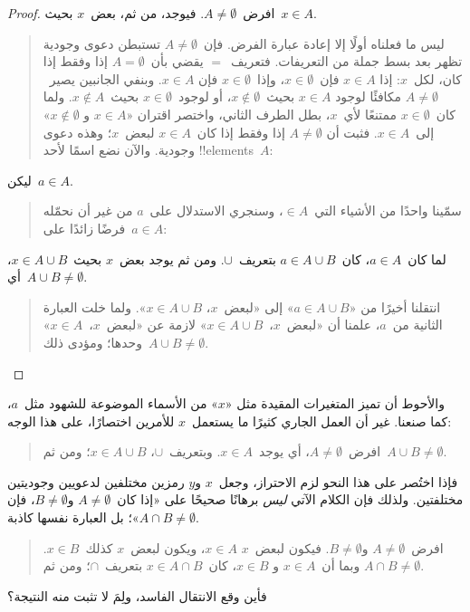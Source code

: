 \documentclass[../../../include/open-logic-section]{subfiles}
\begin{document}
\begin{proof}
  افرض~$A \neq \emptyset$. فيوجد، من ثم، بعض~$x$ بحيث~$x \in A$.
  \begin{quote}
    ليس ما فعلناه أولًا إلا إعادة عبارة الفرض. فإن~$A \neq \emptyset$
    تستبطن دعوى وجودية تظهر بعد بسط جملة من التعريفات. فتعريف~$=$
    يقضي بأن~$A = \emptyset$ إذا وفقط إذا كان، لكل~$x$: إذا
    $x \in A$ فإن~$x \in \emptyset$، وإذا~$x \in \emptyset$ فإن
    $x \in A$. وبنفي الجانبين يصير~$A \neq \emptyset$ مكافئًا لوجود
    $x \in A$ بحيث~$x \notin \emptyset$، أو لوجود~$x \in \emptyset$
    بحيث~$x \notin A$. ولما كان~$x \in \emptyset$ ممتنعًا لأي~$x$،
    بطل الطرف الثاني، واختصر اقتران «$x \in A$ و
    $x \notin \emptyset$» إلى~$x \in A$. فثبت أن
    $A \neq \emptyset$ إذا وفقط إذا كان~$x \in A$ لبعض~$x$؛ وهذه
    دعوى وجودية. والآن نضع اسمًا لأحد !!{element}s~$A$:
  \end{quote}
  ليكن~$a \in A$.
  \begin{quote}
    سمّينا واحدًا من الأشياء التي~$\in A$، وسنجري الاستدلال على~$a$
    من غير أن نحمّله فرضًا زائدًا على~$a \in A$:
  \end{quote}
  لما كان~$a \in A$، كان~$a \in A \cup B$ بتعريف~$\cup$. ومن ثم
  يوجد بعض~$x$ بحيث~$x \in A \cup B$، أي~$A \cup B \neq \emptyset$.
  \begin{quote}
    انتقلنا أخيرًا من «$a \in A \cup B$» إلى «لبعض~$x$،
    $x \in A \cup B$». ولما خلت العبارة الثانية من~$a$، علمنا أن
    «لبعض~$x$،~$x \in A \cup B$» لازمة عن «لبعض~$x$،~$x \in A$»
    وحدها؛ ومؤدى ذلك~$A \cup B \neq \emptyset$.
  \end{quote}
\end{proof}

والأحوط أن تميز المتغيرات المقيدة مثل «$x$» من الأسماء الموضوعة
للشهود مثل~$a$، كما صنعنا. غير أن العمل الجاري كثيرًا ما يستعمل~$x$
للأمرين اختصارًا، على هذا الوجه:
\begin{quote}
افرض~$A \neq \emptyset$، أي يوجد~$x \in A$. وبتعريف~$\cup$،
$x \in A \cup B$؛ ومن ثم~$A \cup B \neq \emptyset$.
\end{quote}
فإذا اختُصر على هذا النحو لزم الاحتراز، وجعل~$x$ و$y$ رمزين مختلفين
لدعويين وجوديتين مختلفتين. ولذلك فإن الكلام الآتي \emph{ليس} برهانًا
صحيحًا على «إذا كان~$A \neq \emptyset$ و$B \neq \emptyset$، فإن
$A \cap B \neq \emptyset$»؛ بل العبارة نفسها كاذبة.
\begin{quote}
افرض~$A \neq \emptyset$ و$B \neq \emptyset$. فيكون لبعض~$x$
$x \in A$، ويكون لبعض~$x$ كذلك~$x \in B$. وبما أن~$x \in A$ و
$x \in B$، كان~$x \in A \cap B$ بتعريف~$\cap$؛ ومن ثم
$A \cap B \neq \emptyset$.
\end{quote}
فأين وقع الانتقال الفاسد، ولِمَ لا تثبت منه النتيجة؟
\end{document}
